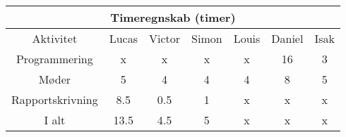 \centering
\begin{tabular}{ |c|c|c|c|c|c|c|  }
 \hline
 \multicolumn{7}{|c|}{Timeregnskab (timer)} \\
 \hline
 Aktivitet & Lucas & Victor & Simon & Louis & Daniel & Isak\\
 \hline
 
 
 Programmering      & x & x & x & x & 16 & 3 \\
 
 Møder              & 5 & 4 & 4 & 4 & 8 & 5 \\
 
 Rapportskrivning   & 8.5 & 0.5 & 1 & x & x & x \\
 
 \hline
 
 I alt              & 13.5 & 4.5 & 5 & x & x & x \\
 
 
 \hline
\end{tabular}